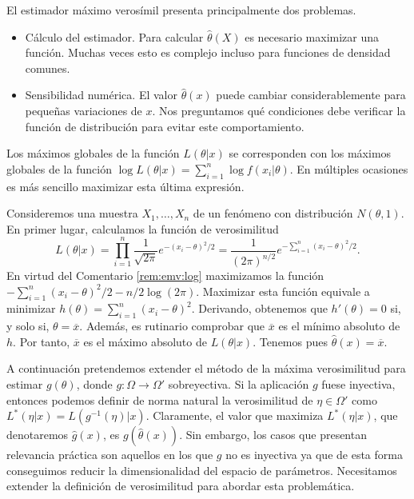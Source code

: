 \documentclass{article}
\begin{document}
    El estimador máximo verosímil presenta principalmente dos problemas.
    \begin{itemize}
        \item Cálculo del estimador. Para calcular $\hat{\theta}(X)$ es necesario maximizar una función. Muchas veces esto es complejo incluso para funciones de densidad comunes.
        \item Sensibilidad numérica. El valor $\hat{\theta}(x)$ puede cambiar considerablemente para pequeñas variaciones de $x$. Nos preguntamos qué condiciones debe verificar la función de distribución para evitar este comportamiento.
    \end{itemize}

    \begin{remark} \label{rem:emv:log}
        Los máximos globales de la función $L(\theta | x)$ se corresponden con los máximos globales de la función $\log L(\theta | x) = \sum_{i = 1}^n \log f(x_i | \theta)$. En múltiples ocasiones es más sencillo maximizar esta última expresión.
    \end{remark}

    \begin{example}
        Consideremos una muestra $X_1, \ldots, X_n$ de un fenómeno con distribución $N(\theta,1)$. En primer lugar, calculamos la función de verosimilitud
        \[L(\theta | x) = \prod_{i = 1}^n \frac{1}{\sqrt{2\pi}} e^{-(x_i - \theta)^2 / 2} = \frac{1}{(2\pi)^{n/2}}e^{-\sum_{i = 1}^n (x_i - \theta)^2 / 2}.\]
        En virtud del Comentario \ref{rem:emv:log} maximizamos la función $-\sum_{i = 1}^n (x_i - \theta)^2 / 2 - n/2 \log(2\pi)$. Maximizar esta función equivale a minimizar $h(\theta) = \sum_{i = 1}^n (x_i - \theta)^2$. Derivando, obtenemos que $h'(\theta) = 0$ si, y solo si, $\theta = \overline{x}$. Además, es rutinario comprobar que $\overline{x}$ es el mínimo absoluto de $h$. Por tanto, $\overline{x}$ es el máximo absoluto de $L(\theta | x)$. Tenemos pues $\hat{\theta}(x) = \overline{x}$.
    \end{example}

    A continuación pretendemos extender el método de la máxima verosimilitud para estimar $g(\theta)$, donde $g : \Omega \to \Omega'$ sobreyectiva. Si la aplicación $g$ fuese inyectiva, entonces podemos definir de norma natural la verosimilitud de $\eta \in \Omega'$ como $L^*(\eta | x) = L(g^{-1}(\eta) | x)$. Claramente, el valor que maximiza $L^*(\eta | x)$, que denotaremos $\hat{g}(x)$, es $g(\hat{\theta}(x))$. Sin embargo, los casos que presentan relevancia práctica son aquellos en los que $g$ no es inyectiva ya que de esta forma conseguimos reducir la dimensionalidad del espacio de parámetros. Necesitamos extender la definición de verosimilitud para abordar esta problemática.
\end{document}

